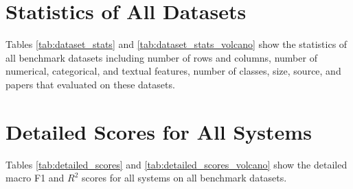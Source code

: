 \newpage
\appendix

\section{Statistics of All Datasets}



Tables \ref{tab:dataset_stats} and \ref{tab:dataset_stats_volcano} show the statistics of all benchmark datasets including number of rows and columns, number of numerical, categorical, and textual features, number of classes, size, source, and papers that evaluated on these datasets.

\section{Detailed Scores for All Systems}



Tables \ref{tab:detailed_scores} and \ref{tab:detailed_scores_volcano} show the detailed macro F1 and $R^2$ scores for all systems on all benchmark datasets.
